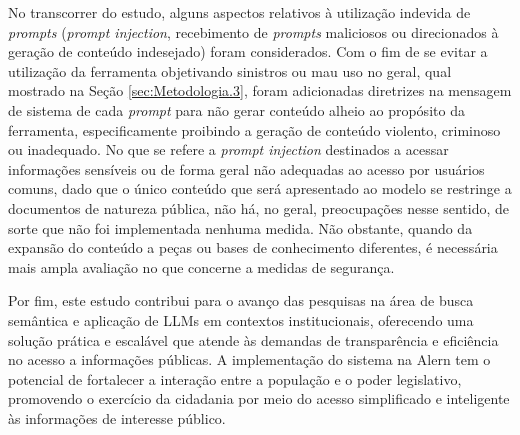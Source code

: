 No transcorrer do estudo, alguns aspectos relativos à utilização indevida de \textit{prompts} (\textit{prompt injection}, recebimento de \textit{prompts} maliciosos ou direcionados à geração de conteúdo indesejado) foram considerados. Com o fim de se evitar a utilização da ferramenta objetivando sinistros ou mau uso no geral, qual mostrado na Seção \ref{sec:Metodologia.3}, foram adicionadas diretrizes na mensagem de sistema de cada \textit{prompt} para não gerar conteúdo alheio ao propósito da ferramenta, especificamente proibindo a geração de conteúdo violento, criminoso ou inadequado. No que se refere a \textit{prompt injection} destinados a acessar informações sensíveis ou de forma geral não adequadas ao acesso por usuários comuns, dado que o único conteúdo que será apresentado ao modelo se restringe a documentos de natureza pública, não há, no geral, preocupações nesse sentido, de sorte que não foi implementada nenhuma medida. Não obstante, quando da expansão do conteúdo a peças ou bases de conhecimento diferentes, é necessária mais ampla avaliação no que concerne a medidas de segurança.

Por fim, este estudo contribui para o avanço das pesquisas na área de busca semântica e aplicação de \ac{LLM}s em contextos institucionais, oferecendo uma solução prática e escalável que atende às demandas de transparência e eficiência no acesso a informações públicas. A implementação do sistema na \ac{Alern} tem o potencial de fortalecer a interação entre a população e o poder legislativo, promovendo o exercício da cidadania por meio do acesso simplificado e inteligente às informações de interesse público.